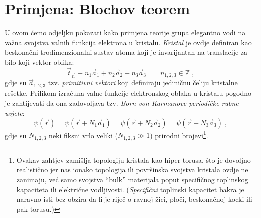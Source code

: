 \section{Primjena: Blochov teorem}

U ovom ćemo odjeljku pokazati kako primjena teorije grupa elegantno
vodi na važna svojstva valnih funkcija elektrona u kristalu.
\emph{Kristal} je ovdje definiran kao beskonačni trodimenzionalni
sustav atoma koji je invarijantan na translacije 
za bilo koji vektor oblika:
\begin{equation}
  \vec{t}_{\vec{n}} \equiv n_1 \vec{a}_1 + n_2 \vec{a}_2 
  + n_3  \vec{a}_3 \qquad n_{1,2,3}\in\mathbb{Z}\;,
\label{tn}
\end{equation}
gdje su $\vec{a}_{1,2,3}$ tzv. \emph{primitivni vektori} koji definiraju
jediničnu čeliju kristalne rešetke. Prilikom izračuna valne funkcije 
elektronskog
oblaka u kristalu pogodno je zahtijevati da ona zadovoljava tzv.
\emph{Born-von Karmanove periodičke rubne uvjete}:
\begin{equation}
 \psi(\vec{r}) = \psi(\vec{r} + N_1 \vec{a}_1)= \psi(\vec{r} + N_2 \vec{a}_2)
= \psi(\vec{r} + N_3 \vec{a}_3) \;,
\end{equation}
gdje su $N_{1,2,3}$ neki fiksni vrlo veliki ($N_{1,2,3}\gg 1$) prirodni 
brojevi\footnote{
Ovakav zahtjev zamišlja topologiju kristala kao hiper-torusa, što je
dovoljno realistično jer nas ionako topologija ili površinska svojstva
kristala ovdje ne zanimaju, već samo svojstva ``bulk'' materijala poput
specifičnog toplinskog kapaciteta ili električne vodljivosti.
(\emph{Specifični} toplinski kapacitet bakra je naravno isti bez obzira da li je riječ
o ravnoj žici, ploči, beskonačnoj kocki ili pak torusu.)}.

